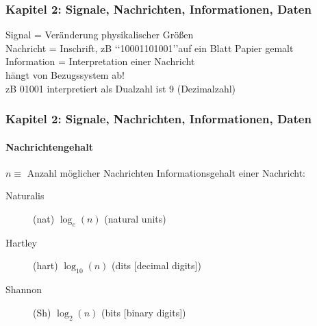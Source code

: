 \documentclass{beamer}
\begin{document}
	\begin{frame}
		\frametitle{Kapitel 2: Signale, Nachrichten, Informationen, Daten}
		Signal = Veränderung physikalischer Größen\\
		Nachricht =  Inschrift, zB \lq\lq{10001101001}\rq\rq auf ein Blatt Papier gemalt\\
		Information = Interpretation einer Nachricht\\
		hängt von Bezugssystem ab!\\
		zB 01001 interpretiert als Dualzahl ist 9 (Dezimalzahl)
	\end{frame}
	\begin{frame}
		\frametitle{Kapitel 2: Signale, Nachrichten, Informationen, Daten}
		\framesubtitle{Nachrichtengehalt}
		$n \equiv$ Anzahl möglicher Nachrichten
		Informationsgehalt einer Nachricht:
		\begin{description}
			\item[Naturalis](nat) $\log_e(n)$  (natural units)
			\item[Hartley] (hart) $\log_{10}(n)$ (dits [decimal digits])
			\item[Shannon] (Sh) $\log_2(n)$ (bits [binary digits])
		\end{description}
	\end{frame}
\end{document}
